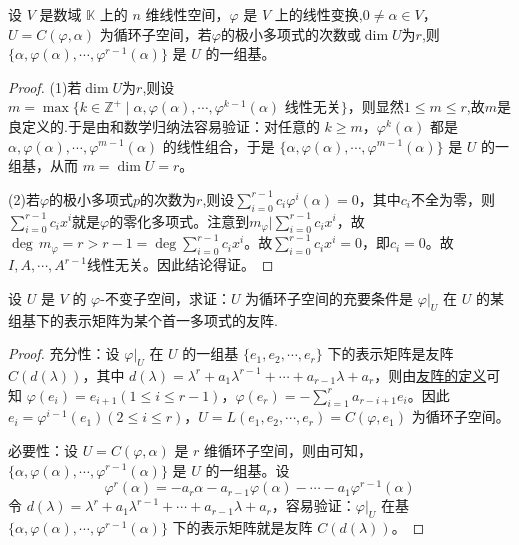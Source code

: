 \documentclass[../../main.tex]{subfiles}%
\begin{document}
\begin{theorem}\label{theorem:循环子空间的基}
设 \(V\) 是数域 \(\mathbb{K}\) 上的 \(n\) 维线性空间，\(\varphi\) 是 \(V\) 上的线性变换,\(0\neq\alpha\in V\)， \(U = C(\varphi,\alpha)\) 为循环子空间，若$\varphi$的极小多项式的次数或$\dim U$为$r$,则\(\{\alpha,\varphi(\alpha),\cdots,\varphi^{r - 1}(\alpha)\}\) 是 \(U\) 的一组基。
\end{theorem}
\begin{proof}

(1)若$\dim U$为$r$,则设 \(m = \max\{k\in\mathbb{Z}^+\mid\alpha,\varphi(\alpha),\cdots,\varphi^{k - 1}(\alpha)\text{ 线性无关}\}\)，则显然$1\leqslant  m\leqslant  r$,故$m$是良定义的.于是由和数学归纳法容易验证：对任意的 \(k\geqslant  m\)，\(\varphi^k(\alpha)\) 都是 \(\alpha,\varphi(\alpha),\cdots,\varphi^{m - 1}(\alpha)\) 的线性组合，于是 \(\{\alpha,\varphi(\alpha),\cdots,\varphi^{m - 1}(\alpha)\}\) 是 \(U\) 的一组基，从而 \(m = \dim U = r\)。 

(2)若$\varphi$的极小多项式$p$的次数为$r$,则设$\sum_{i=0}^{r-1}c_i\varphi^i(\alpha)=0$，其中$c_i$不全为零，则$\sum_{i=0}^{r-1}c_ix^i$就是$\varphi$的零化多项式。注意到$m_{\varphi}|\sum_{i=0}^{r-1}c_ix^i$，故$\deg\,m_{\varphi}=r>r-1=\deg\sum_{i=0}^{r-1}c_ix^i$。故$\sum_{i=0}^{r-1}c_ix^i=0$，即$c_i=0$。故$I,A,\cdots,A^{r-1}$线性无关。因此结论得证。

\end{proof}

\begin{theorem}\label{theorem:不变子空间是循环子空间的充要条件}
设 \(U\) 是 \(V\) 的 \(\varphi\)-不变子空间，求证：\(U\) 为循环子空间的充要条件是 \(\varphi|_U\) 在 \(U\) 的某组基下的表示矩阵为某个首一多项式的友阵.
\end{theorem}
\begin{proof}

{\heiti 充分性：}设 \(\varphi|_U\) 在 \(U\) 的一组基 \(\{e_1,e_2,\cdots,e_r\}\) 下的表示矩阵是友阵 \(C(d(\lambda))\)，其中 \(d(\lambda)=\lambda^r + a_1\lambda^{r - 1}+\cdots + a_{r - 1}\lambda + a_r\)，则由\hyperref[proposition:多项式的友矩和Frobenius块]{友阵的定义}可知 \(\varphi(e_i)=e_{i + 1}(1\leqslant  i\leqslant  r - 1)\)，\(\varphi(e_r)=-\sum_{i = 1}^{r}a_{r - i + 1}e_i\)。因此 \(e_i=\varphi^{i - 1}(e_1)(2\leqslant  i\leqslant  r)\)，\(U = L(e_1,e_2,\cdots,e_r)=C(\varphi,e_1)\) 为循环子空间。

{\heiti 必要性：}设 \(U = C(\varphi,\alpha)\) 是 \(r\) 维循环子空间，则由可知，\(\{\alpha,\varphi(\alpha),\cdots,\varphi^{r - 1}(\alpha)\}\) 是 \(U\) 的一组基。设 
\[
\varphi^r(\alpha)=-a_r\alpha - a_{r - 1}\varphi(\alpha)-\cdots - a_1\varphi^{r - 1}(\alpha)
\]
令 \(d(\lambda)=\lambda^r + a_1\lambda^{r - 1}+\cdots + a_{r - 1}\lambda + a_r\)，容易验证：\(\varphi|_U\) 在基 \(\{\alpha,\varphi(\alpha),\cdots,\varphi^{r - 1}(\alpha)\}\) 下的表示矩阵就是友阵 \(C(d(\lambda))\)。

\end{proof}
\end{document}
